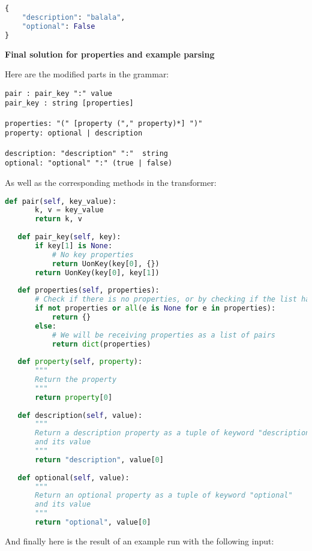 \documentclass[12pt]{article}
\begin{document}
\begin{lstlisting}[language=Python]
{
    "description": "balala",
    "optional": False
}
\end{lstlisting}

\textbf{Final solution for properties and example parsing}

Here are the modified parts in the grammar:
\begin{lstlisting}
pair : pair_key ":" value
pair_key : string [properties]

properties: "(" [property ("," property)*] ")"
property: optional | description

description: "description" ":"  string 
optional: "optional" ":" (true | false)
\end{lstlisting}
As well as the corresponding methods in the transformer:
\begin{lstlisting}[language=Python]
def pair(self, key_value):
       k, v = key_value
       return k, v
 
   def pair_key(self, key):
       if key[1] is None:
           # No key properties
           return UonKey(key[0], {})
       return UonKey(key[0], key[1])
 
   def properties(self, properties):
       # Check if there is no properties, or by checking if the list has only None
       if not properties or all(e is None for e in properties):
           return {}
       else:
           # We will be receiving properties as a list of pairs
           return dict(properties)
 
   def property(self, property):
       """
       Return the property
       """
       return property[0]
 
   def description(self, value):
       """
       Return a description property as a tuple of keyword "description"
       and its value
       """
       return "description", value[0]
 
   def optional(self, value):
       """
       Return an optional property as a tuple of keyword "optional"
       and its value
       """
       return "optional", value[0]
\end{lstlisting}

And finally here is the result of an example run with the following input: 
\end{document}
